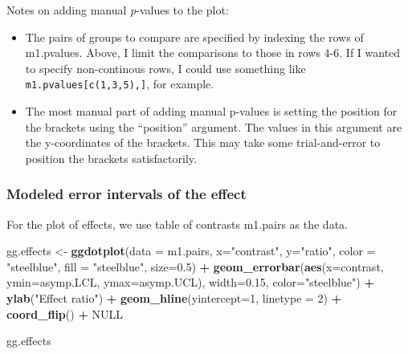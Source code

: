 \documentclass[]{book}
\newenvironment{Shaded}{\begin{snugshade}}{\end{snugshade}}
\newcommand{\DataTypeTok}[1]{\textcolor[rgb]{0.13,0.29,0.53}{#1}}
\newcommand{\DecValTok}[1]{\textcolor[rgb]{0.00,0.00,0.81}{#1}}
\newcommand{\FloatTok}[1]{\textcolor[rgb]{0.00,0.00,0.81}{#1}}
\newcommand{\KeywordTok}[1]{\textcolor[rgb]{0.13,0.29,0.53}{\textbf{#1}}}
\newcommand{\NormalTok}[1]{#1}
\newcommand{\OperatorTok}[1]{\textcolor[rgb]{0.81,0.36,0.00}{\textbf{#1}}}
\newcommand{\OtherTok}[1]{\textcolor[rgb]{0.56,0.35,0.01}{#1}}
\newcommand{\StringTok}[1]{\textcolor[rgb]{0.31,0.60,0.02}{#1}}
\providecommand{\tightlist}{%
  \setlength{\itemsep}{0pt}\setlength{\parskip}{0pt}}
\begin{document}
Notes on adding manual \emph{p}-values to the plot:

\begin{itemize}
\tightlist
\item
  The pairs of groups to compare are specified by indexing the rows of m1.pvalues. Above, I limit the comparisons to those in rows 4-6. If I wanted to specify non-continous rows, I could use something like \texttt{m1.pvalues{[}c(1,3,5),{]}}, for example.
\item
  The most manual part of adding manual p-values is setting the position for the brackets using the ``position'' argument. The values in this argument are the y-coordinates of the brackets. This may take some trial-and-error to position the brackets satisfactorily.
\end{itemize}

\hypertarget{modeled-error-intervals-of-the-effect}{%
\subsubsection{Modeled error intervals of the effect}\label{modeled-error-intervals-of-the-effect}}

For the plot of effects, we use table of contrasts m1.pairs as the data.

\begin{Shaded}
\begin{Highlighting}[]
\NormalTok{gg.effects <-}\StringTok{ }\KeywordTok{ggdotplot}\NormalTok{(}\DataTypeTok{data =}\NormalTok{ m1.pairs,}
                        \DataTypeTok{x=}\StringTok{"contrast"}\NormalTok{, }
                        \DataTypeTok{y=}\StringTok{"ratio"}\NormalTok{, }
                        \DataTypeTok{color =} \StringTok{"steelblue"}\NormalTok{,}
                        \DataTypeTok{fill =} \StringTok{"steelblue"}\NormalTok{,}
                        \DataTypeTok{size=}\FloatTok{0.5}\NormalTok{) }\OperatorTok{+}
\StringTok{  }
\StringTok{  }\KeywordTok{geom_errorbar}\NormalTok{(}\KeywordTok{aes}\NormalTok{(}\DataTypeTok{x=}\NormalTok{contrast, }
                    \DataTypeTok{ymin=}\NormalTok{asymp.LCL, }
                    \DataTypeTok{ymax=}\NormalTok{asymp.UCL),}
                \DataTypeTok{width=}\FloatTok{0.15}\NormalTok{, }
                \DataTypeTok{color=}\StringTok{"steelblue"}\NormalTok{) }\OperatorTok{+}
\StringTok{  }\KeywordTok{ylab}\NormalTok{(}\StringTok{"Effect ratio"}\NormalTok{) }\OperatorTok{+}
\StringTok{  }\KeywordTok{geom_hline}\NormalTok{(}\DataTypeTok{yintercept=}\DecValTok{1}\NormalTok{, }\DataTypeTok{linetype =} \DecValTok{2}\NormalTok{) }\OperatorTok{+}
\StringTok{  }\KeywordTok{coord_flip}\NormalTok{() }\OperatorTok{+}\StringTok{ }
\StringTok{  }
\StringTok{  }\OtherTok{NULL}

\NormalTok{gg.effects}
\end{Highlighting}
\end{Shaded}
\end{document}
